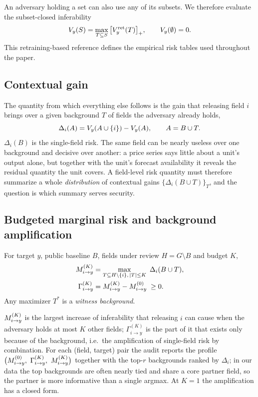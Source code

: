 An adversary holding a set can also use any of its subsets. We therefore evaluate the subset-closed inferability
\begin{equation}\label{eq:closure}
V_y(S)=\max_{T\subseteq S}\big[V_y^{\mathrm{ret}}(T)\big]_+,\qquad V_y(\emptyset)=0.
\end{equation}
This retraining-based reference defines the empirical risk tables used throughout the paper.

\subsection{Contextual gain}
The quantity from which everything else follows is the gain that releasing field $i$ brings over a
given background $T$ of fields the adversary already holds,
\begin{equation}\label{eq:delta}
\Delta_i(A)=V_y(A \cup \{i\}) - V_y(A),\qquad A=B\cup T .
\end{equation}
$\Delta_i(B)$ is the single-field risk. The same field can be nearly useless over one background
and decisive over another: a price series says little about a unit's output alone, but together
with the unit's forecast availability it reveals the residual quantity the unit covers. A
field-level risk quantity must therefore summarize a whole \emph{distribution} of contextual gains
$\{\Delta_i(B\cup T)\}_T$, and the question is which summary serves security.

\subsection{Budgeted marginal risk and background amplification}
\begin{definition}\label{def:mk}
For target $y$, public baseline $B$, fields under review $H=G\setminus B$ and budget $K$,
\begin{align}
\Mik &= \max_{T \subseteq H \setminus \{i\},\, |T| \le K}\ \Delta_i(B\cup T), \label{eq:mk}\\
\Gamma^{(K)}_{i\to y} &= \Mik - M^{(0)}_{i\to y} \;\ge 0 . \label{eq:gamma}
\end{align}
Any maximizer $T^{*}$ is a \emph{witness background}.
\end{definition}
$M^{(K)}_{i\to y}$ is the largest increase of inferability that releasing $i$ can cause when the adversary
holds at most $K$ other fields; $\Gamma^{(K)}_{i\to y}$ is the part of it that exists only because of
the background, i.e.\ the amplification of single-field risk by combination. For each (field,
target) pair the audit reports the profile $\big(M^{(0)}_{i\to y},\ \Gamma^{(K)}_{i\to y},\ \Mik\big)$
together with the top-$r$ backgrounds ranked by $\Delta_i$; in our data the top backgrounds are
often nearly tied and share a core partner field, so the partner is more informative than a
single argmax. At $K=1$ the amplification has a closed form.

